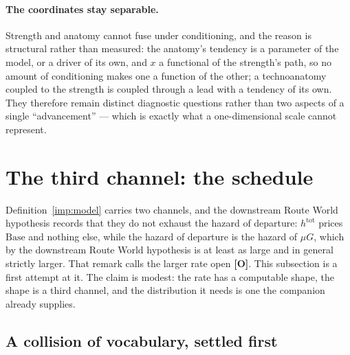 \paragraph{The coordinates stay separable.}\label{gr:rem:separable}
Strength and anatomy cannot fuse under conditioning, and the reason is
structural rather than measured: the anatomy's tendency is a parameter of
the model, or a driver of its own, and $x$ a functional of the strength's
path, so no amount of conditioning makes one a function of the other; a
technoanatomy coupled to the strength is coupled through a lead with a
tendency of its own. They therefore remain distinct diagnostic
questions rather than two aspects of a single ``advancement'' --- which
is exactly what a one-dimensional scale cannot represent.



\section{The third channel: the schedule}\label{sec:schedule}


Definition~\ref{imp:model} carries two channels, and
the downstream Route World hypothesis records that they do not exhaust the
hazard of departure: $h^{\mathrm{tot}}$ prices $\mathrm{Base}$ and
nothing else, while the hazard of departure is the hazard of $\mu G$,
which by the downstream Route World hypothesis is at least as large and in general
strictly larger. That remark calls the larger rate open \textbf{[O]}. This subsection is a first attempt at it. The claim is modest: the rate
has a computable shape, the shape is a third channel, and the
distribution it needs is one the companion already supplies.

\subsection{A collision of vocabulary, settled first}
\label{sch:subsub:vocab}

